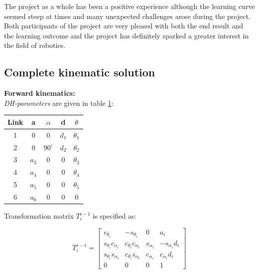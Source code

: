 \documentclass[11pt,a4paper, titlepage]{article}
\begin{document}
The project as a whole has been a positive experience although the learning curve seemed steep at times and many unexpected challenges arose during the project. Both participants of the project are very pleased with both the end result and the learning outcome and the project has definitely sparked a greater interest in the field of robotics.
	
\newpage
{}
\begin{appendices}
\section{Complete kinematic solution}
\label{appendix:ik}

\textbf{Forward kinematics:} \\

\textit{DH-parameters} are given in table \ref{tab:DH}:
\begin{table}[h!]
\centering
\begin{tabular}{| c | c | c | c | c |}
\hline
Link 		& a 			& $\alpha$ 	& d & $\theta$ \\\hline
1 & 0 		& 0 			& $d_1$ 	& $\theta_1$ \\\hline
2 & 0 		& $90^\circ$ 	& $d_2$ 	& $\theta_2$ \\\hline
3 & $a_3$ 	& 0 			& 0 		& $\theta_3$ \\\hline
4 & $a_4$ 	& 0 			& 0 		& $\theta_4$ \\\hline
5 & $a_5$ 	& 0 			& 0 		& $\theta_5$ \\\hline
6 & $a_6$ 	& 0 			& 0 		& 0 \\\hline
\end{tabular}
  \label{tab:DH}
\end{table}

Transformation matrix $T_i^{i-1}$ is specified as:

\begin{equation*}
T_i^{i-1} = \begin{bmatrix}
c_{\theta_i} & -s_{\theta_i} & 0 & a_i \\
s_{\theta_i}c_{\alpha_i} & c_{\theta_i}c_{\alpha_i} & s_{\alpha_i} & -s_{\alpha_i}d_i \\
s_{\theta_i}s_{\alpha_i} & c_{\theta_i}s_{\alpha_i} & c_{\alpha_i} & c_{\alpha_i}d_i \\
0 & 0 & 0 & 1
\end{bmatrix}
\end{equation*}


\end{appendices}
\end{document}
